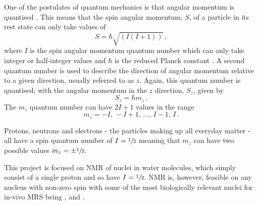 One of the postulates of quantum mechanics is that angular momentum is quantised \cite{DeGraaf2007}. This means that the spin angular momentum, $S$, of a particle in its rest state can only take values of 
\begin{equation}
S = \hbar \sqrt{(I(I+1))} \,,
\label{eq:angmom_quant}
\end{equation} 
where $I$ is the spin angular momentum quantum number which can only take integer or half-integer values and $\hbar$ is the reduced Planck constant \cite{DeGraaf2007}.
A second quantum number is used to describe the direction of angular momentum relative to a given direction, usually referred to as $z$. 
Again, this quantum number is quantised, with the angular momentum in the $z$ direction, $S_z$, given by 
\begin{equation}
S_z = \hbar m_z \,.
\label{eq:angmom_z}
\end{equation} 
The $m_z$ quantum number can have $2I + 1$ values in the range \cite{DeGraaf2007}
\begin{equation}
m_z = -I,\, -I + 1,\,\dots,\, I-1,\, I\,.
\label{eq:m_z}
\end{equation}

Protons, neutrons and electrons - the particles making up all everyday matter - all have a spin quantum number of $I = \sfrac{1}{2}$ meaning that $m_z$ can have two possible values $m_z = \pm \sfrac{1}{2}$.


 

This project is focused on \ac{NMR} of  nuclei in water molecules, which simply consist of a single proton and so have $I = \sfrac{1}{2}$. 
\ac{NMR} is, however, feasible on any nucleus with non-zero spin with some of the most biologically relevant nuclei for in-vivo MRS being ,  and  \cite{DeGraaf2007}.

